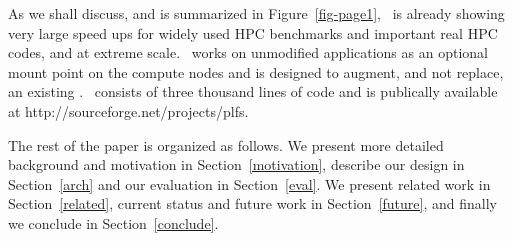 As we shall discuss, and is summarized in Figure~\ref{fig-page1}, \plfs\ is
already showing very large speed ups for widely used HPC benchmarks and
important real HPC codes, and at extreme scale.  \plfs\ works on unmodified
applications as an optional mount point on the compute nodes and is designed to
augment, and not replace, an existing \upfs.  \plfs\ consists of three thousand
lines of code and is publically available at
http://sourceforge.net/projects/plfs.

The rest of the paper is organized as follows.  We present more detailed background and
motivation in Section~\ref{motivation}, describe our design in
Section~\ref{arch} and our evaluation in Section~\ref{eval}.  We present
related work in Section~\ref{related}, current status and future work in
Section~\ref{future}, and finally we conclude in Section~\ref{conclude}.

